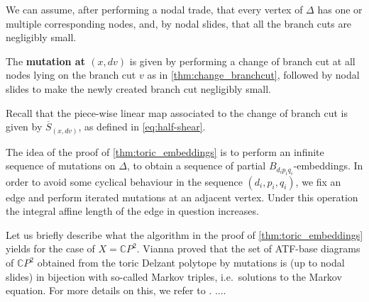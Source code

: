 \documentclass[12pt,a4paper,draft]{scrartcl}
\begin{document}
We can assume, after performing a nodal trade, that every vertex of $Δ$ has one or multiple corresponding nodes, and, by nodal slides, that all the branch cuts are negligibly small.

\begin{definition}
  \label{def:mutation_at_atf_corner}
  The \textbf{mutation at $(x,dv)$} is given by performing a change of branch cut at all nodes lying on the branch cut $v$ as in \cref{thm:change_branchcut}, followed by nodal slides to make the newly created branch cut negligibly small.
\end{definition}

Recall that the piece-wise linear map associated to the change of branch cut is given by $\overline{S}_{(x,dv)}$, as defined in \eqref{eq:half-shear}.

The idea of the proof of \cref{thm:toric_embeddings} is to perform an infinite sequence of mutations on $Δ$, to obtain a sequence of partial $B_{d_i p_i q_i}$-embeddings.
In order to avoid some cyclical behaviour in the sequence $(d_i,p_i,q_i)$, we fix an edge and perform iterated mutations at an adjacent vertex. Under this operation the integral affine length of the edge in question increases.

\begin{remark}
    Let us briefly describe what the algorithm in the proof of \cref{thm:toric_embeddings} yields for the case of $X = \mathbb{C}P^2$. Vianna \cite{Via16} proved that the set of ATF-base diagrams of $\mathbb{C}P^2$ obtained from the toric Delzant polytope by mutations is (up to nodal slides) in bijection with so-called Markov triples, i.e.\ solutions to the Markov equation. For more details on this, we refer to \cite[Section 8.4, Appendix I]{evans2021atfs}. ....
\end{remark}
\end{document}
